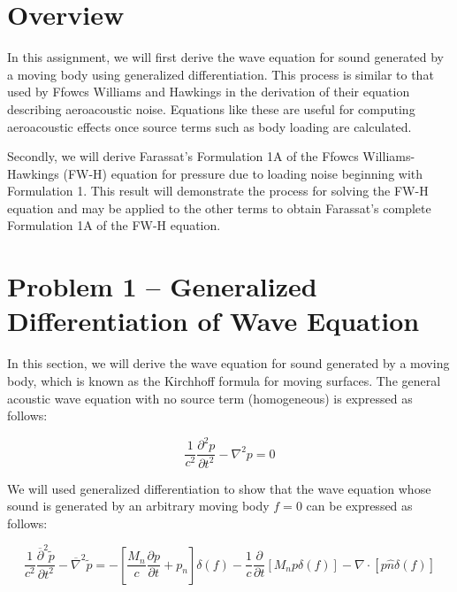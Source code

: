 \documentclass[]{aiaa-tc}%
\begin{document}
\section*{Overview} %

In this assignment, we will first derive the wave equation for sound generated by a moving body using generalized differentiation.  This process is similar to that used by Ffowcs Williams and Hawkings in the derivation of their equation describing aeroacoustic noise.  Equations like these are useful for computing aeroacoustic effects once source terms such as body loading are calculated.

Secondly, we will derive Farassat's Formulation 1A of the Ffowcs Williams-Hawkings (FW-H) equation for pressure due to loading noise beginning with Formulation 1.  This result will demonstrate the process for solving the FW-H equation and may be applied to the other terms to obtain Farassat's complete Formulation 1A of the FW-H equation.





\section{Problem 1 -- Generalized Differentiation of Wave Equation} \label{SecGenDiff}

In this section, we will derive the wave equation for sound generated by a moving body, which is known as the Kirchhoff formula for moving surfaces.  The general acoustic wave equation with no source term (homogeneous) is expressed as follows:

\begin{equation} \label{AcousticWaveHomo}
\boxed{\dfrac{1}{c^2}\dfrac{\partial^2p}{\partial t^2} - \nabla^2p = 0}
\end{equation}

We will used generalized differentiation to show that the wave equation whose sound is generated by an arbitrary moving body $f=0$ can be expressed as follows:

\begin{equation} \label{AcousticWaveBody}
\boxed{\dfrac{1}{c^2}\dfrac{ \overline{\partial}^2\widetilde{p}}{\partial t^2}
    - \overline{\nabla}^2 \widetilde{p}
= -\left[ \dfrac{M_n}{c} \dfrac{\partial p}{\partial t} + p_n \right] \delta(f)
    -\dfrac{1}{c} \dfrac{\partial}{\partial t} \left[ M_n p \delta(f) \right]
    -\nabla \cdot \left[ p \hat{n} \delta(f) \right]}
\end{equation}
\end{document}
